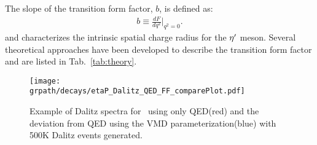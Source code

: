  The slope of the transition form factor, $b$, is defined as:
\begin{align}
b \equiv \frac{dF}{dq^2}|_{q^2=0} \label{eq:tffslope}.
\end{align}
and characterizes the intrinsic spatial charge radius for the $\eta^{\prime}$ meson. Several theoretical approaches have been developed to describe the transition form factor and are listed in Tab.~\ref{tab:theory}.

 \begin{figure}[h!]\begin{center}
 		\texttt{[image: \\grpath/decays/etaP\_Dalitz\_QED\_FF\_comparePlot.pdf]}\label{fig:etap_dalitz_conpare}
 		\caption[Dalitz  for \etaTP \ and $\phi$]{\label{fig:dalitz_compare}Example of Dalitz spectra for \etaTP \ using only QED(red) and the deviation from QED using the VMD parameterization(blue) with 500K Dalitz events generated. }
 	\end{center}\end{figure}



\FloatBarrier 	 
